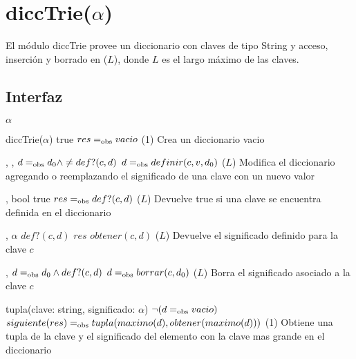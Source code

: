 \section{diccTrie($\alpha$)}

El módulo diccTrie provee un diccionario con claves de tipo String y acceso, inserción y borrado en \bigo($L$), donde $L$ es el largo máximo de las claves.

\subsection{Interfaz}

\begin{iparamformales}{$\alpha$}

\end{iparamformales}

\iusa{}
\ioperaciones

{}
{diccTrie($\alpha$)}
{true}
{$res =_{\mathrm{obs}} vacio$}
{\bigo(1)}
{}
{Crea un diccionario vacio}

{   ,
    ,
    }
{}
{$d =_{\mathrm{obs}} d_0 \land \neq def?(c, d)$}
{$d =_{\mathrm{obs}} definir(c, v, d_0)$}
{\bigo($L$)}
{Modifica el diccionario agregando o reemplazando el significado de una clave
    con un nuevo valor}

{   ,
    }
{bool}
{true}
{$res =_{\mathrm{obs}} def?(c, d)$}
{\bigo($L$)}
{}
{Devuelve true si una clave se encuentra definida en el diccionario}

{   ,
    }
{$\alpha$}
{$def?(c, d)$}
{$res$ \igobs $obtener(c, d)$}
{\bigo($L$)}
{}
{Devuelve el significado definido para la clave $c$}

{   ,
    }
{}
{$d =_{\mathrm{obs}} d_0 \land def?(c, d)$}
{$d =_{\mathrm{obs}} borrar(c, d_0)$}
{\bigo($L$)}
{}
{Borra el significado asociado a la clave $c$}

{   }
{tupla(clave: string, significado: $\alpha$)}
{$\neg (d =_{\mathrm{obs}} vacio)$}
{$siguiente(res) =_{\mathrm{obs}} tupla(maximo(d), obtener(maximo(d)))$}
{\bigo(1)}
{}
{Obtiene una tupla de la clave y el significado del elemento con la clave
    mas grande en el diccionario}

